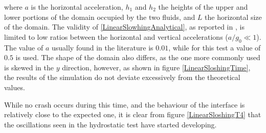 \documentclass[11pt, a4paper, oneside, openany]{book}
\begin{document}
where $a$ is the horizontal acceleration, $h_{1}$ and $h_{2}$ the heights of the upper and lower portions of the domain occupied by the two fluids, and $L$ the horizontal size of the domain. The validity of \eqref{LinearSlowhingAnalytical}, as reported in \cite{Bardin2015}, is limited to low ratios between the horizontal and vertical accelerations ($a / g_{0}\ll 1$). The value of $a$ usually found in the literature \cite{Bardin2015}\cite{Grenier2013} is $0.01$, while for this test a value of $0.5$ is used. The shape of the domain also differs, as the one more commonly used is skewed in the $y$ direction, however, as shown in figure \ref{LinearSloshingTime}, the results of the simulation do not deviate excessively from the theoretical values.\par
While no crash occurs during this time, and the behaviour of the interface is relatively close to the expected one, it is clear from figure \ref{LinearSloshingT4} that the oscillations seen in the hydrostatic test have started developing.
\end{document}
